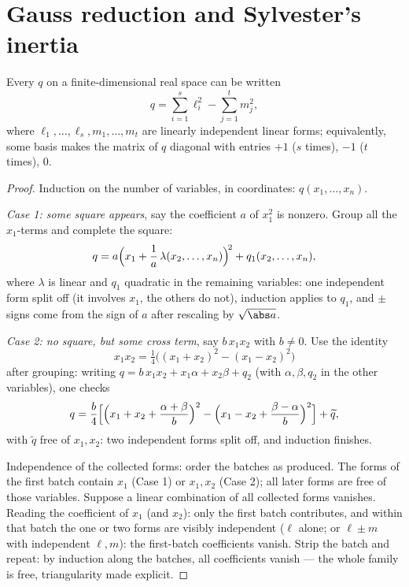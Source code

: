 \section{Gauss reduction and Sylvester's inertia}

\begin{theorem}\label{thm:b2:quadratic:gauss}
Every  $q$ on a finite-dimensional real space can be
written
\[
q = \sum_{i=1}^{s} \ell_i^2 - \sum_{j=1}^{t} m_j^2 ,
\]
where $\ell_1, \dots, \ell_s, m_1, \dots, m_t$ are linearly
independent linear forms; equivalently, some basis makes the
matrix of $q$ diagonal with entries $+1$ ($s$ times), $-1$ ($t$
times), $0$.
\end{theorem}

\begin{proof}
Induction on the number of variables, in coordinates: $q(x_1,
\dots, x_n)$.

\emph{Case 1: some square appears}, say the coefficient $a$ of
$x_1^2$ is nonzero. Group all the $x_1$-terms and complete the
square:
\[
q = a\Bigl(x_1 + \frac{1}{a}\,\lambda(x_2, \dots,
x_n)\Bigr)^{\!2} + q_1(x_2, \dots, x_n),
\]
where $\lambda$ is linear and $q_1$ quadratic in the remaining
variables: one independent form split off (it involves $x_1$, the
others do not), induction applies to $q_1$, and $\pm$ signs come
from the sign of $a$ after rescaling by $\sqrt{\abs a}$.

\emph{Case 2: no square, but some cross term}, say $b\,x_1x_2$ with
$b \neq 0$. Use the identity
\[
x_1x_2 = \tfrac14\bigl((x_1 + x_2)^2 - (x_1 - x_2)^2\bigr)
\]
after grouping: writing $q = b\,x_1x_2 + x_1\alpha + x_2\beta +
q_2$ (with $\alpha, \beta, q_2$ in the other variables), one checks
\[
q = \frac{b}{4}\Bigl[\Bigl(x_1 + x_2 + \frac{\alpha +
\beta}{b}\Bigr)^{2} - \Bigl(x_1 - x_2 + \frac{\beta -
\alpha}{b}\Bigr)^{2}\Bigr] + \widetilde q ,
\]
with $\widetilde q$ free of $x_1, x_2$: two independent forms split
off, and induction finishes.

Independence of the collected forms: order the batches as
produced. The forms of the first batch contain $x_1$ (Case 1)
or $x_1, x_2$ (Case 2); all later forms are free of those
variables. Suppose a linear combination of all collected forms
vanishes. Reading the coefficient of $x_1$ (and $x_2$): only
the first batch contributes, and within that batch the one or
two forms are visibly independent ($\ell$ alone; or $\ell \pm
m$ with independent $\ell, m$): the first-batch coefficients
vanish. Strip the batch and repeat: by induction along the
batches, all coefficients vanish --- the whole family is free,
triangularity made explicit.
\end{proof}

